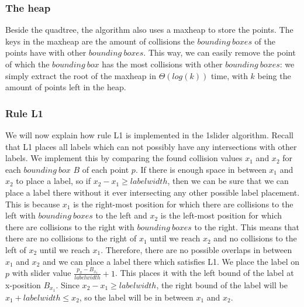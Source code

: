 \documentclass[crop=false,a4paper,oneside,11pt]{article}
\begin{document}
\subsubsection{The heap}
Beside the quadtree, the algorithm also uses a maxheap to store the points. The keys in the maxheap are the amount of collisions the $bounding \ boxes$ of the points have with other $bounding \ boxes$. This way, we can easily remove the point of which the $bounding \ box$ has the most collisions with other $bounding \ boxes$: we simply extract the root of the maxheap in $\Theta(log (k))$ time, with $k$ being the amount of points left in the heap. 
\subsubsection{Rule L1}
We will now explain how rule L1 is implemented in the 1slider algorithm. Recall that L1 places all labels which can not possibly have any intersections with other labels. We implement this by comparing the found collision values $x_1$ and $x_2$ for each $bounding \ box$ $B$ of each point $p$. If there is enough space in between $x_1$ and $x_2$ to place a label, so if $x_2 - x_1 \geq labelwidth$, then we can be sure that we can place a label there without it ever intersecting any other possible label placement. This is because $x_1$ is the right-most position for which there are collisions to the left with $bounding \ boxes$ to the left and $x_2$ is the left-most position for which there are collisions to the right with $bounding \ boxes$ to the right. This means that there are no collisions to the right of $x_1$ until we reach $x_2$ and no collisions to the left of $x_2$ until we reach $x_1$. Therefore, there are no possible overlaps in between $x_1$ and $x_2$ and we can place a label there which satisfies L1. We place the label on $p$ with slider value $\frac{p_x - B_{x_1}}{labelwidth} + 1$. This places it with the left bound of the label at x-position $B_{x_1}$. Since $x_2 - x_1 \geq labelwidth$, the right bound of the label will be $x_1 + labelwidth \leq x_2$, so the label will be in between $x_1$ and $x_2$.
\end{document}
